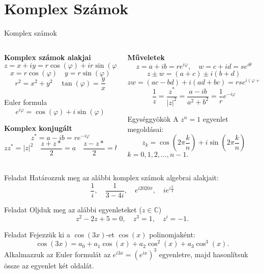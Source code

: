 \documentclass[10pt]{beamer}
\newcommand{\C}[0]{\mathbb{C}}
\begin{document}
\section{Komplex Számok}
\begin{frame}[t]{Komplex számok}
\begin{columns}[t]
\begin{column}{0.48\linewidth}
{\bf Komplex számok alakjai}
\[z = x + iy = r\cos(\varphi) + ir\sin(\varphi)\]
\[x = r\cos(\varphi) \quad y = r\sin(\varphi)\]
\[r^2 = x^2 + y^2 \quad \tan(\varphi) = \frac{y}{x}\]
\begin{block}{Euler formula}
 \[e^{i\varphi} = \cos(\varphi) + i\sin(\varphi)\]
\end{block}
{\bf Komplex konjugált}
\[z^* = a - ib = r e^{-i\varphi}\]
\[z z^* = |z|^2 \quad \frac{z + z*}{2} = a \quad \frac{z - z*}{2} = b\]
\end{column}

\begin{column}{0.48\linewidth}
{\bf Műveletek}
\[z = a + ib = re^{i\varphi}, \quad w = c + id = se^{i\theta}\]
\[z \pm w = (a+c) \pm i (b+d)\] 
\[z w = (ac - bd) + i (ad + bc) = rse^{i(\varphi + \theta)}\]
\[\frac{1}{z} = \frac{z^*}{|z|^2} = \frac{a-ib}{a^2 + b^2} = \frac{1}{r} e^{-i\varphi}\]
\begin{block}{Egységgyökök}
A $z^n = 1$ egyenlet megoldásai:
\[z_k = \cos\left(2\pi\frac{k}{n}\right) + i\sin\left(2\pi\frac{k}{n}\right)\]
$k=0,1,2,\dots,n-1.$ 
\end{block}
\end{column}
\end{columns}    
\end{frame}

\begin{frame}
\begin{center}
\resizebox{!}{\textheight}{%
\begin{tikzpicture}[scale=4.0,cap=round,>=latex]
 
\end{tikzpicture}
}
\end{center}
\end{frame}

\begin{frame}[t]{}
\begin{exampleblock}{Feladat}
Határozzuk meg az alábbi komplex számok algebrai alakjait:
\[ \frac{1}{i}, \quad \dfrac{1}{3-4i}, \quad e^{i2020\pi}, \quad ie^{i\frac{\pi}{2}}\]
\end{exampleblock}

\begin{exampleblock}{Feladat}
Oljduk meg az alábbi egyenleteket ($z\in\C$)
\[z^2 - 2z + 5 = 0, \quad z^3 = 1, \quad z^i = -1.\]
\end{exampleblock}

\begin{exampleblock}{Feladat}
Fejezzük ki a $\cos(3x)$-et $\cos(x)$ polinomjaként:
\[\cos(3x) = a_0 + a_1 \cos(x) + a_2 \cos^2(x) + a_3 \cos^3(x).\]
{\tiny Alkalmazzuk az Euler formulát az $e^{i3x} = (e^{ix})^3$ egyenletre, majd hasonlítsuk össze az egyenlet két oldalát.}
\end{exampleblock}
\end{frame}
\end{document}
